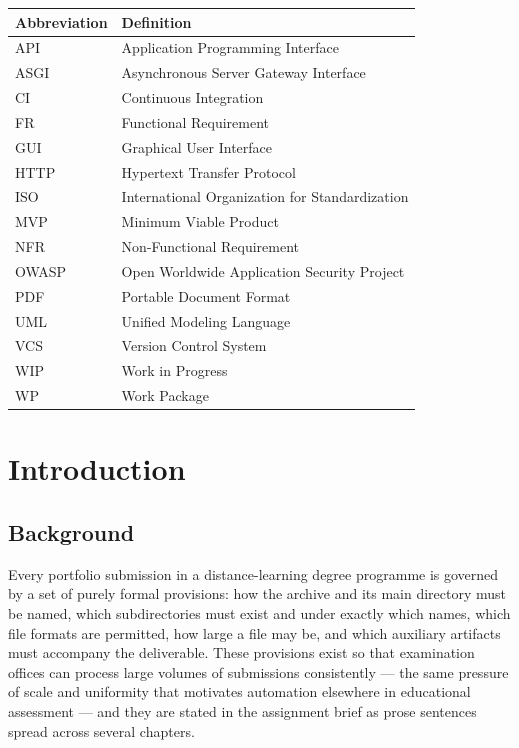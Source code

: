 \documentclass[a4paper,11pt]{article}
\begin{document}
\begin{tabularx}{\textwidth}{@{}l X@{}}
\toprule
\textbf{Abbreviation} & \textbf{Definition} \\
\midrule
API   & Application Programming Interface \\
ASGI  & Asynchronous Server Gateway Interface \\
CI    & Continuous Integration \\
FR    & Functional Requirement \\
GUI   & Graphical User Interface \\
HTTP  & Hypertext Transfer Protocol \\
ISO   & International Organization for Standardization \\
MVP   & Minimum Viable Product \\
NFR   & Non-Functional Requirement \\
OWASP & Open Worldwide Application Security Project \\
PDF   & Portable Document Format \\
UML   & Unified Modeling Language \\
VCS   & Version Control System \\
WIP   & Work in Progress \\
WP    & Work Package \\
\bottomrule
\end{tabularx}

\newpage

\setcounter{page}{1}

\section{Introduction}\label{sec:intro}

\subsection{Background}\label{subsec:background}

Every portfolio submission in a distance-learning degree programme is governed
by a set of purely formal provisions: how the archive and its main directory
must be named, which subdirectories must exist and under exactly which names,
which file formats are permitted, how large a file may be, and which auxiliary
artifacts must accompany the deliverable. These provisions exist so that
examination offices can process large volumes of submissions consistently ---
the same pressure of scale and uniformity that motivates automation elsewhere in
educational assessment \citep{Paiva2022} --- and they are stated in the
assignment brief as prose sentences spread across several chapters.
\end{document}
